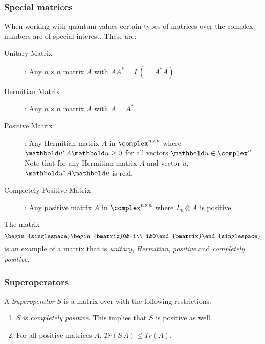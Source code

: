 \subsubsection{Special matrices}
When working with quantum values certain types of matrices over the 
complex numbers are of special interest.
These are:
\begin{description}
\item[Unitary Matrix]: Any $n \times n$ 
matrix $A$ with $A A^{*} = I\ (= A^{*} A)$. 
\item[Hermitian Matrix]: Any  $n \times n$ matrix $A$ with $A=A^{*}$.
\item[Positive Matrix]: Any Hermitian matrix $A$ in 
$\complex^{n\times n}$
where $\vc{u}^{*} A \vc{u} \ge 0$ for all vectors 
$\vc{u}\in \complex^n$. Note 
that for any Hermitian matrix $A$ and vector $u$, 
$\vc{u}^{*} A \vc{u}$ is real.
\item[Completely Positive Matrix]: Any positive matrix $A$ in 
$\complex^{n\times n}$
where $I_m \otimes A$ is positive.
\end{description}
The matrix 
\[{\begin{singlespace}\begin{bmatrix}0&-i\\
i&0\end{bmatrix}\end{singlespace}}\]
is an example of a matrix that is \emph{unitary}, \emph{Hermitian},
\emph{positive} and \emph{completely positive}.

\subsubsection{Superoperators}
A \emph{Superoperator} $S$ is a matrix over \complex{} 
with the following restrictions:
\begin{enumerate}
\item{} $S$ is \emph{completely positive}. This implies that 
$S$ is positive as well. 
\item{} For all positive matrices $A$, $Tr(S\,A) \leq Tr(A)$.
\end{enumerate}
